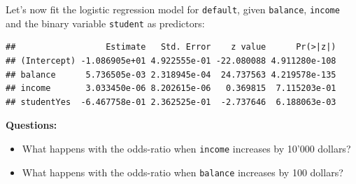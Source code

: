 \documentclass[10pt,ignorenonframetext,]{beamer}
\newenvironment{Shaded}{\begin{snugshade}}{\end{snugshade}}
\newcommand{\KeywordTok}[1]{\textcolor[rgb]{0.13,0.29,0.53}{\textbf{#1}}}
\newcommand{\DataTypeTok}[1]{\textcolor[rgb]{0.13,0.29,0.53}{#1}}
\newcommand{\StringTok}[1]{\textcolor[rgb]{0.31,0.60,0.02}{#1}}
\newcommand{\OperatorTok}[1]{\textcolor[rgb]{0.81,0.36,0.00}{\textbf{#1}}}
\newcommand{\NormalTok}[1]{#1}
\providecommand{\tightlist}{%
  \setlength{\itemsep}{0pt}\setlength{\parskip}{0pt}}
\begin{document}
\begin{frame}[fragile]

Let's now fit the logistic regression model for \texttt{default}, given
\texttt{balance}, \texttt{income} and the binary variable
\texttt{student} as predictors:

\scriptsize

\begin{Shaded}
\end{Shaded}

\begin{verbatim}
##                  Estimate   Std. Error    z value      Pr(>|z|)
## (Intercept) -1.086905e+01 4.922555e-01 -22.080088 4.911280e-108
## balance      5.736505e-03 2.318945e-04  24.737563 4.219578e-135
## income       3.033450e-06 8.202615e-06   0.369815  7.115203e-01
## studentYes  -6.467758e-01 2.362525e-01  -2.737646  6.188063e-03
\end{verbatim}

\normalsize

\textbf{Questions:}

\begin{itemize}
\tightlist
\item
  What happens with the odds-ratio when \texttt{income} increases by
  10'000 dollars?
\end{itemize}

\begin{itemize}
\tightlist
\item
  What happens with the odds-ratio when \texttt{balance} increases by
  100 dollars?
\end{itemize}

\end{frame}
\end{document}
